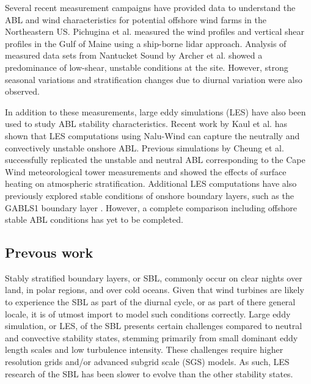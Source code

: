 \documentclass[conf]{new-aiaa}
\begin{document}
Several recent measurement campaigns have provided data to understand
the ABL and wind characteristics for potential offshore wind farms in
the Northeastern US.  Pichugina et al. \cite{pichugina2017properties}
measured the wind profiles and vertical shear profiles in the Gulf of
Maine using a ship-borne lidar approach.  Analysis of measured data
sets from Nantucket Sound by Archer et
al. \cite{archer2016predominance} showed a predominance of low-shear,
unstable conditions at the site.  However, strong seasonal variations
and stratification changes due to diurnal variation were also
observed.

In addition to these measurements, large eddy simulations (LES) have
also been used to study ABL stability characteristics.  Recent work by
Kaul et al. \cite{kaul2020large} has shown that LES computations using
Nalu-Wind can capture the neutrally and convectively unstable onshore
ABL.  Previous simulations by Cheung et al. \cite{cheung2020large}
successfully replicated the unstable and neutral ABL corresponding to
the Cape Wind meteorological tower measurements
\cite{archer2016predominance} and showed the effects of surface
heating on atmospheric stratification.  Additional LES computations
\cite{sullivan2016turbulent} have also previously explored stable
conditions of onshore boundary layers, such as the GABLS1 boundary
layer \cite{beare2006intercomparison}.  However, a complete comparison
including offshore stable ABL conditions has yet to be completed.

\subsection{Prevous work}


Stably stratified boundary layers, or SBL, commonly occur on clear nights over land, in polar regions, and over cold oceans. Given that wind turbines are likely to experience the SBL as part of the diurnal cycle, or as part of there general locale, it is of utmost import to model such conditions correctly. Large eddy simulation, or LES, of the SBL presents certain challenges compared to neutral and convective stability states, stemming primarily from small dominant eddy length scales and low turbulence intensity. These challenges require higher resolution grids and/or advanced subgrid scale (SGS) models. As such, LES research of the SBL has been slower to evolve than the other stability states.  
\end{document}
